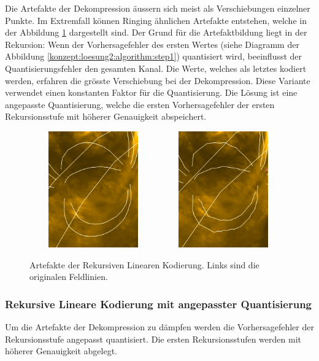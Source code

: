 Die Artefakte der Dekompression äussern sich meist als Verschiebungen einzelner Punkte. Im Extremfall können Ringing ähnlichen Artefakte entstehen, welche in der Abbildung \ref{resultate:loesung2:adaptive:median:artefakte} dargestellt sind. Der Grund für die Artefaktbildung liegt in der Rekursion: Wenn der Vorhersagefehler des ersten Wertes (siehe Diagramm der Abbildung \ref{konzept:loesung2:algorithm:step1}) quantisiert wird, beeinflusst der Quantisierungsfehler den gesamten Kanal. Die Werte, welches als letztes kodiert werden, erfahren die grösste Verschiebung bei der Dekompression. Diese Variante verwendet einen konstanten Faktor für die Quantisierung. Die Lösung ist eine angepasste Quantisierung, welche die ersten Vorhersagefehler der ersten Rekursionsstufe mit höherer Genauigkeit abspeichert.

\begin{figure}[!htbp]
	\center
		\includegraphics[width=0.49\textwidth,height=5cm,keepaspectratio]{./pictures/resultate/loesung2/variante3/no_artifacts.png}
	\includegraphics[width=0.49\textwidth,height=5cm,keepaspectratio]{./pictures/resultate/loesung2/variante3/artifacts_8.png}
	\caption{Artefakte der Rekursiven Linearen Kodierung. Links sind die originalen Feldlinien.}
	\label{resultate:loesung2:adaptive:median:artefakte}
\end{figure}

\subsubsection{Rekursive Lineare Kodierung mit angepasster Quantisierung}
Um die Artefakte der Dekompression zu dämpfen werden die Vorhersagefehler der Rekursionsstufe angepasst quantisiert. Die ersten Rekursionsstufen werden mit höherer Genauigkeit abgelegt.

